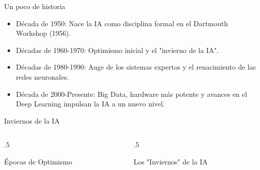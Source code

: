 \documentclass{beamer}
\begin{document}
\begin{frame}{Un poco de historia}
\begin{itemize}
\item Década de 1950: Nace la IA como disciplina formal en el Dartmouth Workshop (1956).
\item Décadas de 1960-1970: Optimismo inicial y el "invierno de la IA".
\item Décadas de 1980-1990: Auge de los sistemas expertos y el renacimiento de las redes neuronales.
\item Década de 2000-Presente: Big Data, hardware más potente y avances en el Deep Learning impulsan la IA a un nuevo nivel.
\end{itemize}
\end{frame}

\begin{frame}{Inviernos de la IA}
  
  \begin{columns}[T]
    \begin{column}{.5\textwidth}
        \begin{block}{Épocas de Optimismo}
        \end{block}
    \end{column}
    \begin{column}{.5\textwidth}
        \begin{block}{Los "Inviernos" de la IA}
        \end{block}
    \end{column}
  \end{columns}
\end{frame}
\end{document}

